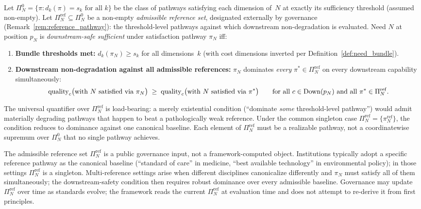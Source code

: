 \begin{definition}
\label{def:downstream_safe}
Let $\Pi_N^0 = \{\pi : d_k(\pi) = s_k \text{ for all } k\}$ be
the class of pathways satisfying each dimension of~$N$ at exactly
its sufficiency threshold (assumed non-empty).  Let
$\Pi_N^{\mathrm{ref}} \subseteq \Pi_N^0$ be a non-empty
\emph{admissible reference set}, designated externally by
governance (Remark~\ref{rem:reference_pathway}): the
threshold-level pathways against which downstream non-degradation
is evaluated.  Need $N$ at position $p_N$ is
\emph{downstream-safe sufficient} under satisfaction pathway
$\pi_N$ iff:
\begin{enumerate}
\item[(a)] \textbf{Bundle thresholds met:}
  $d_k(\pi_N) \geq s_k$ for all dimensions~$k$ (with cost
  dimensions inverted per Definition~\ref{def:need_bundle}).
\item[(b)] \textbf{Downstream non-degradation against all
  admissible references:} $\pi_N$ dominates \emph{every}
  $\pi^* \in \Pi_N^{\mathrm{ref}}$ on every downstream capability
  simultaneously:
  \[
    \mathrm{quality}_c\bigl(\text{with } N \text{ satisfied via }
    \pi_N\bigr)
    \;\geq\;
    \mathrm{quality}_c\bigl(\text{with } N \text{ satisfied via }
    \pi^*\bigr)
    \qquad \text{for all } c \in \mathrm{Down}(p_N)
    \text{ and all } \pi^* \in \Pi_N^{\mathrm{ref}}.
  \]
\end{enumerate}
The universal quantifier over $\Pi_N^{\mathrm{ref}}$ is
load-bearing: a merely existential condition (``dominate
\emph{some} threshold-level pathway'') would admit materially
degrading pathways that happen to beat a pathologically weak
reference.  Under the common singleton case
$\Pi_N^{\mathrm{ref}} = \{\pi_N^{\mathrm{ref}}\}$, the condition
reduces to dominance against one canonical baseline.  Each
element of $\Pi_N^{\mathrm{ref}}$ must be a realizable pathway,
not a coordinatewise supremum over $\Pi_N^0$ that no single
pathway achieves.
\end{definition}

\begin{remark}
\label{rem:reference_pathway}
The admissible reference set $\Pi_N^{\mathrm{ref}}$ is a public
governance input, not a framework-computed object.  Institutions
typically adopt a specific reference pathway as the canonical
baseline (``standard of care'' in medicine, ``best available
technology'' in environmental policy); in those settings
$\Pi_N^{\mathrm{ref}}$ is a singleton.  Multi-reference settings
arise when different disciplines canonicalize differently and
$\pi_N$ must satisfy all of them simultaneously; the
downstream-safety condition then requires robust dominance over
every admissible baseline.  Governance may update
$\Pi_N^{\mathrm{ref}}$ over time as standards evolve; the
framework reads the current $\Pi_N^{\mathrm{ref}}$ at evaluation
time and does not attempt to re-derive it from first principles.
\end{remark}

